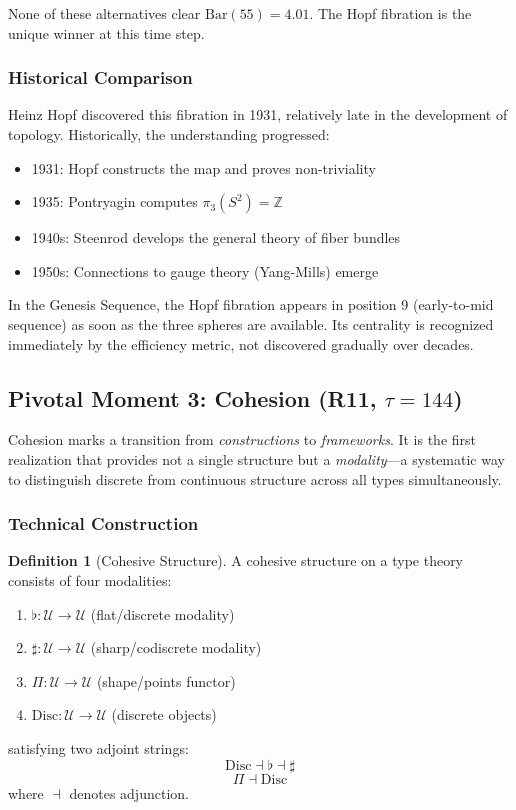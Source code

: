 \documentclass[11pt]{article}
\theoremstyle{definition}
\newtheorem{definition}[theorem]{Definition}
\begin{document}
None of these alternatives clear $\text{Bar}(55) = 4.01$. The Hopf fibration is the unique winner at this time step.

\subsubsection{Historical Comparison}

Heinz Hopf discovered this fibration in 1931, relatively late in the development of topology. Historically, the understanding progressed:
\begin{itemize}
\item 1931: Hopf constructs the map and proves non-triviality
\item 1935: Pontryagin computes $\pi_3(S^2) = \mathbb{Z}$
\item 1940s: Steenrod develops the general theory of fiber bundles
\item 1950s: Connections to gauge theory (Yang-Mills) emerge
\end{itemize}

In the Genesis Sequence, the Hopf fibration appears in position 9 (early-to-mid sequence) as soon as the three spheres are available. Its centrality is recognized immediately by the efficiency metric, not discovered gradually over decades.

\subsection{Pivotal Moment 3: Cohesion (R11, $\tau=144$)}

Cohesion marks a transition from \emph{constructions} to \emph{frameworks}. It is the first realization that provides not a single structure but a \emph{modality}—a systematic way to distinguish discrete from continuous structure across all types simultaneously.

\subsubsection{Technical Construction}

\begin{definition}[Cohesive Structure]
\label{def:cohesion}
A cohesive structure on a type theory consists of four modalities:
\begin{enumerate}
\item $\flat : \mathcal{U} \to \mathcal{U}$ (flat/discrete modality)
\item $\sharp : \mathcal{U} \to \mathcal{U}$ (sharp/codiscrete modality)
\item $\Pi : \mathcal{U} \to \mathcal{U}$ (shape/points functor)
\item $\text{Disc} : \mathcal{U} \to \mathcal{U}$ (discrete objects)
\end{enumerate}
satisfying two adjoint strings:
\[
\text{Disc} \dashv \flat \dashv \sharp
\]
\[
\Pi \dashv \text{Disc}
\]
where $\dashv$ denotes adjunction.
\end{definition}
\end{document}
